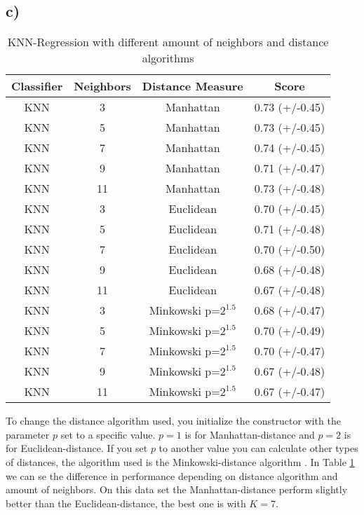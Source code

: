 \documentclass{article}
\begin{document}
      \subsection{c)}
        \begin{table}[h]
          \centering
          \label{tbl:task1c}
          \begin{tabular}{cccc}
            \toprule
            Classifier &  Neighbors & Distance Measure &           Score \\
            \midrule
            KNN &          3 &              Manhattan &  0.73 (+/-0.45) \\
            KNN &          5 &              Manhattan &  0.73 (+/-0.45) \\
            KNN &          7 &              Manhattan &  0.74 (+/-0.45) \\
            KNN &          9 &              Manhattan &  0.71 (+/-0.47) \\
            KNN &         11 &              Manhattan &  0.73 (+/-0.48) \\
            KNN &          3 &              Euclidean &  0.70 (+/-0.45) \\
            KNN &          5 &              Euclidean &  0.71 (+/-0.48) \\
            KNN &          7 &              Euclidean &  0.70 (+/-0.50) \\
            KNN &          9 &              Euclidean &  0.68 (+/-0.48) \\
            KNN &         11 &              Euclidean &  0.67 (+/-0.48) \\
            KNN &          3 &  Minkowski p=$2^{1.5}$ &  0.68 (+/-0.47) \\
            KNN &          5 &  Minkowski p=$2^{1.5}$ &  0.70 (+/-0.49) \\
            KNN &          7 &  Minkowski p=$2^{1.5}$ &  0.70 (+/-0.47) \\
            KNN &          9 &  Minkowski p=$2^{1.5}$ &  0.67 (+/-0.48) \\
            KNN &         11 &  Minkowski p=$2^{1.5}$ &  0.67 (+/-0.47) \\
            \bottomrule
          \end{tabular}
          \caption{KNN-Regression with different amount of neighbors and distance algorithms}
        \end{table}
        To change the distance algorithm used, you initialize the constructor with the parameter $p$ set to a 
        specific value. $p=1$ is for Manhattan-distance and $p=2$ is for Euclidean-distance.
        If you set $p$ to another value you can calculate other types of distances, the algorithm used 
        is the Minkowski-distance algorithm \cite{Minkowski}.
        In Table \ref{tbl:task1c} we can se the difference in performance depending on distance algorithm 
        and amount of neighbors. On this data set the Manhattan-distance perform slightly 
        better than the Euclidean-distance, the best one is with $K=7$.
\end{document}
